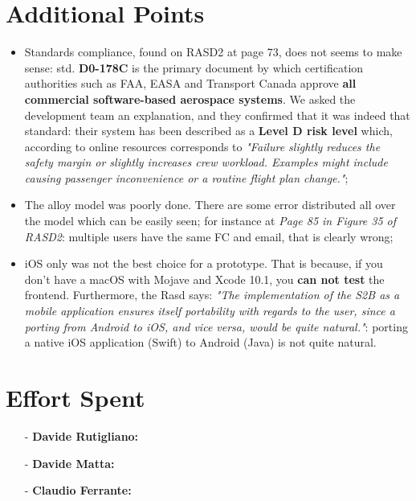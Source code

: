 \documentclass[a4paper]{article}
\begin{document}
\section{Additional Points}
\begin{itemize}
    \item Standards compliance, found on RASD2 at page 73, does not seems to make sense: std. \textbf{D0-178C} is the primary document by which certification authorities such as FAA, EASA and Transport Canada approve \textbf{all commercial software-based aerospace systems}. We asked the development team an explanation, and they confirmed that it was indeed that standard: their system has been described as a \textbf{Level D risk level} which, according to online resources corresponds to \textit{"Failure slightly reduces the safety margin or slightly increases crew workload. Examples might include causing passenger inconvenience or a routine flight plan change."};
    
    \item The alloy model was poorly done. There are some error distributed all over the model which can be easily seen; for instance at \textit{Page 85 in Figure 35 of RASD2}: multiple users have the same FC and email, that is clearly wrong;
    
    \item iOS only was not the best choice for a prototype. That is because, if you don't have a macOS with Mojave and Xcode 10.1, you \textbf{can not test} the frontend. Furthermore, the Rasd says: \textit{"The implementation of the S2B as a mobile application ensures itself portability with regards to the user, since a porting from Android to iOS, and vice versa, would be quite natural."}: porting a native iOS application (Swift) to Android (Java) is not quite natural.
\end{itemize}

\newpage
\section{Effort Spent}
    \begin{itemize}
        \item[-] \textbf{Davide Rutigliano:}
        
        \item[-] \textbf{Davide Matta:}
        
        \item[-] \textbf{Claudio Ferrante:}
    \end{itemize}
\end{document}
